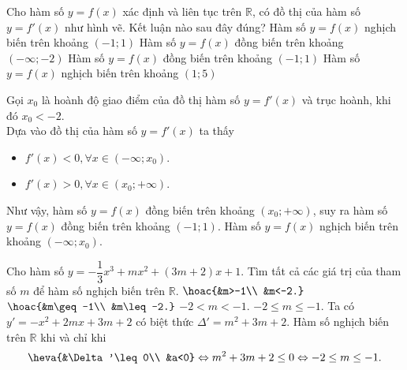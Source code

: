 \begin{ex}%
 \immini
 {
 Cho hàm số $y=f(x)$ xác định và liên tục trên $\mathbb{R}$, có đồ thị của hàm số $y=f'(x)$ như hình vẽ.
 Kết luận nào sau đây đúng?
 \choice
  {Hàm số $y=f(x)$ nghịch biến trên khoảng $(-1;1)$}
  {Hàm số $y=f(x)$ đồng biến trên khoảng $(-\infty;-2)$}
  {\True Hàm số $y=f(x)$ đồng  biến trên khoảng $(-1;1)$}
  {Hàm số $y=f(x)$ nghịch biến trên khoảng $(1;5)$}
 }
 {
 }	
 \loigiai
  {
  Gọi $x_0$ là hoành độ giao điểm của đồ thị hàm số $y=f'(x)$ và trục hoành, khi đó $x_0<-2$.\\
  Dựa vào đồ thị của hàm số $y=f'(x)$ ta thấy
  \begin{itemize}
   \item $f'(x)<0, \forall x\in (-\infty;x_0)$.
   \item $f'(x)>0, \forall x \in (x_0;+\infty)$.
  \end{itemize}
  Như vậy, hàm số $y=f(x)$ đồng biến trên khoảng $(x_0;+\infty)$, suy ra hàm số $y=f(x)$ đồng  biến trên khoảng $(-1;1)$. Hàm số $y=f(x)$ nghịch biến trên khoảng $(-\infty;x_0)$.
  }
\end{ex}

\begin{ex}%
 Cho hàm số $y=-\dfrac{1}{3}x^3+mx^2+(3m+2)x+1$. Tìm tất cả các giá trị của tham số $m$ để hàm số nghịch biến trên $\mathbb{R}$.
 \def\dotEX{}
 \choice
  {$\hoac{&m>-1\\ &m<-2.}$}
  {$\hoac{&m\geq -1\\ &m\leq -2.}$}
  {$-2<m<-1$.}
  {\True $-2\leq m\leq -1$.}
 \loigiai
  {
  Ta có $y'=-x^2+2mx+3m+2$ có biệt thức $\Delta'=m^2+3m+2$. Hàm số nghịch biến trên $\mathbb{R}$ khi và chỉ khi
  \[\heva{&\Delta'\leq 0\\ &a<0}\Leftrightarrow m^2+3m+2\leq 0\Leftrightarrow -2\leq m\leq -1.\]
  }
\end{ex}


